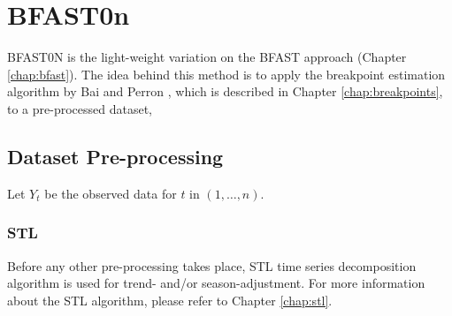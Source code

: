 \documentclass[main.tex]{subfiles}
\begin{document}
\chapter{BFAST0n}
\label{chap:bfast0n}
BFAST0N is the light-weight variation on the BFAST approach (Chapter
\ref{chap:bfast}). The idea behind this method is to apply the breakpoint
estimation algorithm by Bai and Perron \cite{bai_perron},  which is described in Chapter
\ref{chap:breakpoints},  to a pre-processed dataset,

\section{Dataset Pre-processing}
\label{sec:harmonic_model}
Let $Y_t$ be the observed data for $t$ in $(1, \hdots, n)$.
\subsection{STL}
\label{subsec:stl}
Before any other pre-processing takes place, STL time series decomposition algorithm is
used for trend- and/or season-adjustment. For more information about the STL
algorithm, please refer to Chapter {\ref{chap:stl}}.
\end{document}
